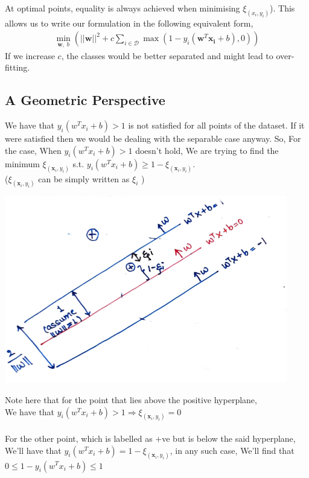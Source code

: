 \documentclass[12pt]{article}
\begin{document}
    At optimal points, equality is always achieved when minimising ${\xi}_{(x_i, y_i)}$). This allows us to write our formulation in the following equivalent form,
    \begin{gather*}
        \min_{\boldsymbol{w},\; b}{(||\boldsymbol{w}||^2+c\sum_{i \in \mathcal{D}}\max(1-y_i(\boldsymbol{w}^T\boldsymbol{x_i}+b), 0))}
    \end{gather*}
    If we increase $c$, the classes would be better separated and might lead to over-fitting.

\newpage 
\subsection*{A Geometric Perspective}
We have that $y_i(w^{T}x_i+b) > 1$ is not satisfied for all points of the dataset.
If it were satisfied then we would be dealing with the separable case anyway. So, For the case, When $y_i(w^T x_i + b) > 1$ doesn't hold, We are trying to find the minimum ${\xi_{(\boldsymbol{x}_i, y_i)}}$ s.t. $y_i (w^T x_i + b) \geq 1- {\xi_{(\boldsymbol{x}_i, y_i)}}$. \\
(${\xi_{(\boldsymbol{x}_i, y_i)}}$  can be simply written as $\xi_i$ )

\begin{center}
    \includegraphics[scale=0.8]{image.png}    
\end{center}

\vspace{5pt}

Note here that for the point that lies above the positive hyperplane, \\ We have that $y_i(w^T x_i + b) > 1 \Rightarrow {\xi_{(\boldsymbol{x}_i, y_i)}} = 0$\\~\\ 
For the other point, which is labelled as $+$ve but is below the said hyperplane, We'll have that $y_i(w^T x_i + b) = 1-{\xi_{(\boldsymbol{x}_i, y_i)}}$, in any such case, We'll find that $0 \leq 1-y_i(w^T x_i + b) \leq 1$
\end{document}
